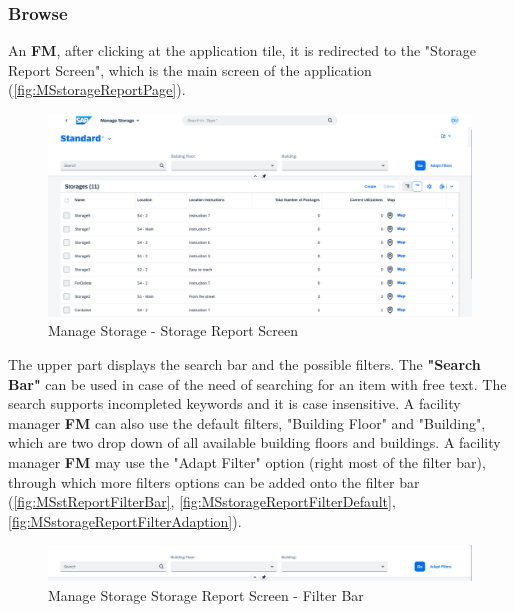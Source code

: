 \subsubsection{Browse}

An \textbf{FM}, after clicking at the application tile, it is redirected to the "Storage Report Screen", which is the main screen of the application (\autoref{fig:MSstorageReportPage}). 

\begin{figure}[H]
	\centering
	\includegraphics[width=1\linewidth]{images/user_doc/storage/StorageReportPage/reportDefaultOverview.png}
	\caption{Manage Storage - Storage Report Screen}
	\label{fig:MSstorageReportPage}
\end{figure}

The upper part displays the search bar and the possible filters. 
The \textbf{"Search Bar"} can be used in case of the need of searching for an item with free text. The search supports incompleted keywords and it is case insensitive.
A facility manager \textbf{FM} can also use the default filters, "Building Floor" and "Building", which are two drop down of all available building floors and buildings. A facility manager \textbf{FM} may use the "Adapt Filter" option (right most of the filter bar), through which more filters options can be added onto the filter bar (\autoref{fig:MSstReportFilterBar}, 
\autoref{fig:MSstorageReportFilterDefault}, 
\autoref{fig:MSstorageReportFilterAdaption}).

\bigskip
\begin{figure}[htb]
	\centering
	\includegraphics[width=1\linewidth]{images/user_doc/storage/StorageReportPage/reportFilterBar.png}
	\caption{Manage Storage Storage Report Screen - Filter Bar}
	\label{fig:MSstReportFilterBar}
\end{figure}

